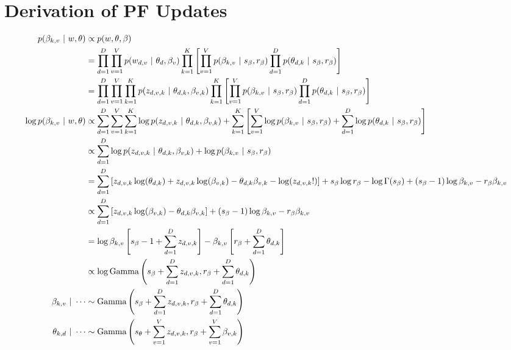 \documentclass[11pt,letterpaper]{article}
\begin{document}
\section{Derivation of PF Updates}
\begin{align}
p(\beta_{k,v} ~\vert~ w, \theta) &\propto  p(w, \theta, \beta) \\
&= \prod_{d=1}^D\prod_{v=1}^V p(w_{d,v} ~\vert~ \theta_d, \beta_v)  \prod_{k=1}^K \left[ \prod_{v=1}^V p(\beta_{k,v} ~\vert~ s_\beta, r_\beta) \prod_{d=1}^D p(\theta_{d,k} ~\vert~ s_\beta, r_\beta)\right] \\
&= \prod_{d=1}^D\prod_{v=1}^V \prod_{k=1}^K p(z_{d,v,k} ~\vert~ \theta_{d,k}, \beta_{v,k})  \prod_{k=1}^K \left[ \prod_{v=1}^V p(\beta_{k,v} ~\vert~ s_\beta, r_\beta) \prod_{d=1}^D p(\theta_{d,k} ~\vert~ s_\beta, r_\beta)\right] \\
\log p(\beta_{k,v} ~\vert~ w, \theta) &\propto \sum_{d=1}^D\sum_{v=1}^V\sum_{k=1}^K \log p(z_{d,v,k} ~\vert~ \theta_{d,k}, \beta_{v,k}) + \sum_{k=1}^K \left[ \sum_{v=1}^V \log p(\beta_{k,v} ~\vert~ s_\beta, r_\beta) + \sum_{d=1}^D \log p(\theta_{d,k} ~\vert~ s_\beta, r_\beta)\right] \\
&\propto \sum_{d=1}^D \log p(z_{d,v,k} ~\vert~ \theta_{d,k}, \beta_{v,k}) + \log p(\beta_{k,v} ~\vert~ s_\beta, r_\beta) \\
&= \sum_{d=1}^D \left[ z_{d,v,k}\log(\theta_{d,k}) + z_{d,v,k}\log(\beta_{v,k}) - \theta_{d,k}\beta_{v,k} - \log(z_{d,v,k}!)\right] + s_\beta \log r_\beta  - \log\Gamma(s_\beta) + (s_\beta - 1) \log \beta_{k,v} - r_\beta \beta_{k,v} \\
&\propto \sum_{d=1}^D \left[ z_{d,v,k}\log(\beta_{v,k}) - \theta_{d,k}\beta_{v,k}\right] + (s_\beta - 1) \log \beta_{k,v} - r_\beta \beta_{k,v} \\
&= \log \beta_{k,v} \left[s_\beta - 1 + \sum_{d=1}^D z_{d,v,k} \right] - \beta_{k,v} \left[ r_\beta  + \sum_{d=1}^D \theta_{d,k} \right]\\
&\propto \log\mbox{Gamma}\left(s_\beta + \sum_{d=1}^D z_{d,v,k}, r_\beta  + \sum_{d=1}^D \theta_{d,k}\right) \\
\beta_{k,v} ~\vert~ \cdots &\sim \mbox{Gamma}\left(s_\beta + \sum_{d=1}^D z_{d,v,k}, r_\beta  + \sum_{d=1}^D \theta_{d,k}\right) \\
\theta_{k,d} ~\vert~ \cdots &\sim \mbox{Gamma}\left(s_\theta + \sum_{v=1}^V z_{d,v,k}, r_\beta  + \sum_{v=1}^V \beta_{v,k}\right)
\end{align}
\end{document}
